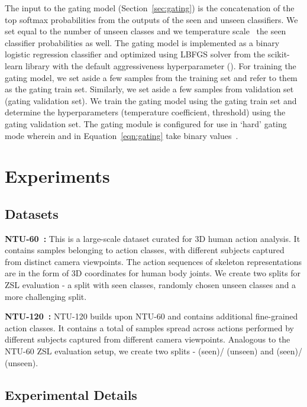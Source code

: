 \documentclass{article}
\begin{document}
The input to the gating model (Section~\ref{sec:gating}) is the concatenation of the top  softmax probabilities from the outputs of the seen and unseen classifiers. We set  equal to the number of unseen classes and we temperature scale~\cite{hinton2015distilling} the seen classifier probabilities as well. The gating model is implemented as a binary logistic regression classifier and optimized using LBFGS solver from the scikit-learn library with the default aggressiveness hyperparameter (). For training the gating model, we set aside a few samples from the training set and refer to them as the gating train set. Similarly, we set aside a few samples from validation set (gating validation set). We train the gating model using the gating train set and determine the hyperparameters (temperature coefficient, threshold) using the gating validation set. The gating module is configured for use in `hard' gating mode wherein  and  in Equation~\ref{eqn:gating} take binary values~\cite{atzmon2019adaptive}.



\section{Experiments}
\label{sec:experiments}

\subsection{Datasets}

\noindent \textbf{NTU-60~\cite{shahroudy2016ntu}:} This is a large-scale dataset curated for 3D human action analysis. It contains  samples belonging to  action classes, with  different subjects captured from  distinct camera viewpoints. The action sequences of skeleton representations are in the form of 3D coordinates for  human body joints. We create two splits for ZSL evaluation - a  split with  seen classes,  randomly chosen unseen classes and a more challenging  split.

\noindent \textbf{NTU-120~\cite{liu2019ntu}:} NTU-120 builds upon NTU-60 and contains  additional fine-grained action classes. It contains a total of  samples spread across  actions performed by  different subjects captured from  different camera viewpoints. Analogous to the NTU-60 ZSL evaluation setup, we create two  splits -  (seen)/ (unseen) and  (seen)/ (unseen).


\subsection{Experimental Details}
\end{document}
